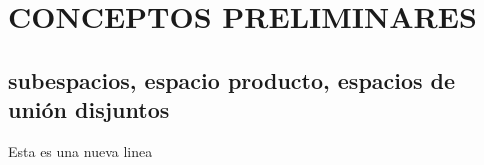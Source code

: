 \chapter{CONCEPTOS PRELIMINARES}

\section{subespacios, espacio producto, espacios de unión disjuntos}
Esta es una nueva linea
